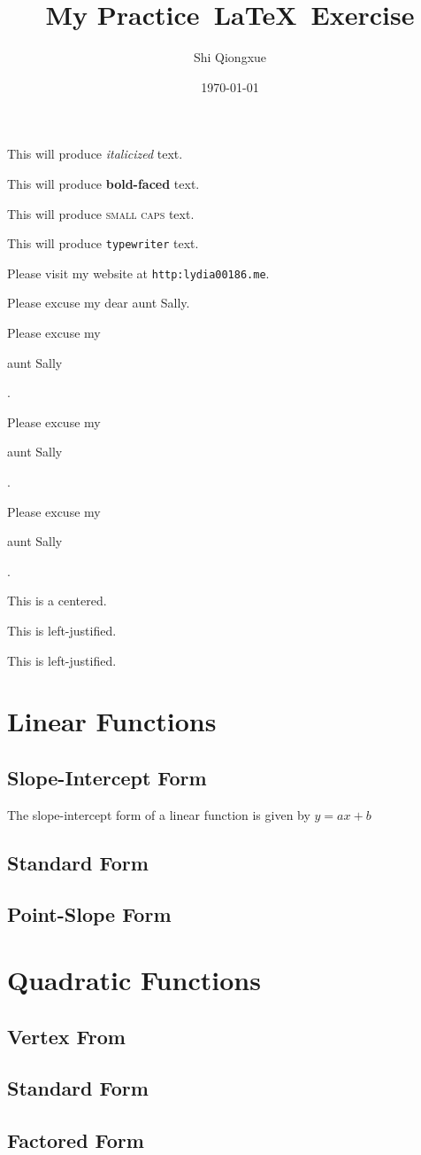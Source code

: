 \documentclass[11pt]{article}
\begin{document}
\tableofcontents

\title{My Practice\ \LaTeX \ Exercise}
\author{Shi Qiongxue}
\date{\today}
\maketitle

This will produce \textit{italicized} text.

This will produce \textbf{bold-faced} text.

This will produce \textsc{small caps} text.

This will produce \texttt{typewriter} text.

Please visit my website at \texttt{http:lydia00186.me}.

Please excuse my dear aunt Sally.

Please excuse my \begin{Large}aunt Sally\end{Large} .

Please excuse my \begin{small}aunt Sally\end{small} .

Please excuse my \begin{tiny}aunt Sally\end{tiny} .

\begin{center}This is a centered. \end{center}

\begin{flushleft} This is left-justified.\end{flushleft}

\begin{flushright} This is left-justified.\end{flushright}

\section{Linear Functions}
       \subsection{Slope-Intercept Form}
       The slope-intercept form of a linear function is given by $y=ax+b$
       \subsection{Standard Form}
       \subsection{Point-Slope Form}
\section{Quadratic Functions}
       \subsection{Vertex From}
       \subsection{Standard Form}
       \subsection{Factored Form}
\end{document}
